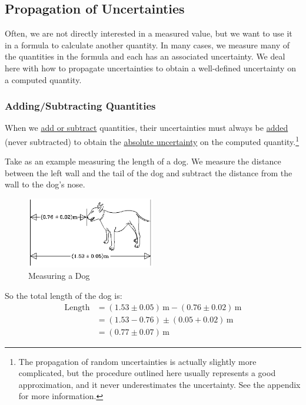 \documentclass{article}
\begin{document}
\subsection{Propagation of Uncertainties}

Often, we are not directly interested in a measured value, but we want to use it in a formula to calculate another quantity. In many cases, we measure many of the quantities in the formula and each has an associated uncertainty. We deal here with how to propagate uncertainties to obtain a well-defined uncertainty on a computed quantity. 

\subsubsection{Adding/Subtracting Quantities}

When we \underline{add or subtract} quantities, their uncertainties must always be \underline{added} (never subtracted) to obtain the \underline{absolute uncertainty} on the computed quantity.\footnote{The propagation of random uncertainties is actually slightly more complicated, but the procedure outlined here usually represents a good approximation, and it never underestimates the uncertainty. See the appendix for more information.}

Take as an example measuring the length of a dog. We measure the distance between the left wall and the tail of the dog and subtract the distance from the wall to the dog's nose.
\begin{figure}[h]
    \begin{center}
        \includegraphics[width=0.5\textwidth]{./Exp1/pic/image2.png}
    \end{center}
    \caption{Measuring a Dog}
    \label{fig:dog}
\end{figure}
So the total length of the dog is:
\begin{equation}
    \begin{split}
        \text{Length} &= (1.53\pm 0.05)\,\mathrm{m} - (0.76 \pm 0.02)\,\mathrm{m} \\
        &= \left( 1.53 - 0.76 \right)\pm\left( 0.05 + 0.02 \right)\,\mathrm{m} \\
        &= \left( 0.77 \pm 0.07 \right)\,\mathrm{m}
    \end{split}
\end{equation}
\end{document}

